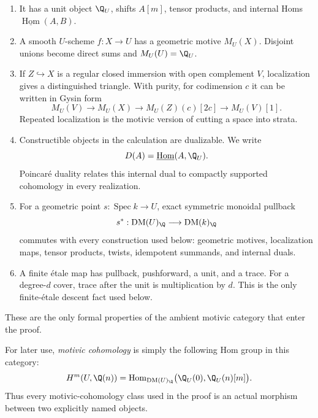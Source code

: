 \begin{enumerate}[label=(\roman*)]
\item It has a unit object \(\Q_U\), shifts \(A[m]\), tensor products, and
      internal Homs \(\underline{\operatorname{Hom}}(A,B)\).

\item A smooth \(U\)-scheme \(f:X\to U\) has a geometric motive \(M_U(X)\).
      Disjoint unions become direct sums and \(M_U(U)=\Q_U\).

\item If \(Z\hookrightarrow X\) is a regular closed immersion with open
      complement \(V\), localization gives a distinguished triangle.  With
      purity, for codimension \(c\) it can be written in Gysin form
      \[
       M_U(V)\longrightarrow M_U(X)\longrightarrow
       M_U(Z)(c)[2c]\longrightarrow M_U(V)[1].
      \]
      Repeated localization is the motivic version of cutting a space into
      strata.

\item Constructible objects in the calculation are dualizable.  We write
      \[
       D(A)=\underline{\operatorname{Hom}}(A,\Q_U).
      \]
      Poincar\'e duality relates this internal dual to compactly supported
      cohomology in every realization.

\item For a geometric point \(s:\operatorname{Spec}k\to U\), exact symmetric
      monoidal pullback
      \[
       s^*: \operatorname{DM}(U)_\Q\longrightarrow
             \operatorname{DM}(k)_\Q
      \]
      commutes with every construction used below: geometric motives,
      localization maps, tensor products, twists, idempotent summands, and
      internal duals.

\item A finite \'etale map has pullback, pushforward, a unit, and a trace.
      For a degree-\(d\) cover, trace after the unit is multiplication by
      \(d\).  This is the only finite-\'etale descent fact used below.
\end{enumerate}

These are the only formal properties of the ambient motivic category that
enter the proof.

For later use, \emph{motivic cohomology} is simply the following Hom group in
this category:
\begin{equation}
 H^m(U,\Q(n))=
 \operatorname{Hom}_{\operatorname{DM}(U)_\Q}
  \bigl(\Q_U(0),\Q_U(n)[m]\bigr).
 \label{cp:eq-motivic-cohomology-definition}
\end{equation}
Thus every motivic-cohomology class used in the proof is an actual morphism
between two explicitly named objects.

